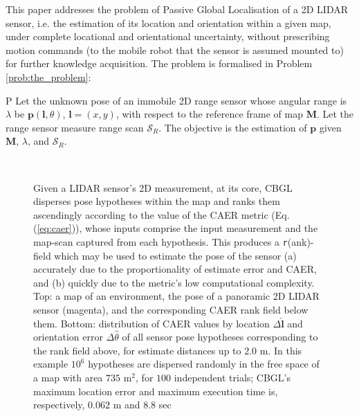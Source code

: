 This paper addresses the problem of Passive Global Localisation of a 2D LIDAR
sensor, i.e. the estimation of its location and orientation within a given map,
under complete locational and orientational uncertainty, without prescribing
motion commands (to the mobile robot that the sensor is assumed mounted to) for
further knowledge acquisition. The problem is formalised in Problem
\ref{prob:the_problem}:

\begin{customprb}{P}
  \label{prob:the_problem}
  Let the unknown pose of an immobile 2D range sensor whose angular range is
  $\lambda$ be $\bm{p}(\bm{l},\theta)$, $\bm{l} = (x,y)$, with respect to the
  reference frame of map $\bm{M}$. Let the range sensor measure range scan
  $\mathcal{S}_R$. The objective is the estimation of $\bm{p}$ given $\bm{M}$,
  $\lambda$, and $\mathcal{S}_R$.
\end{customprb}

\begin{figure}\vspace{0.4em}
  \subfloat{    \label{fig:a}} \vspace{-1.7cm}\\
  \subfloat{\hspace{-0.3cm} \label{fig:b}}
  \caption{\small
           Given a LIDAR sensor's 2D measurement, at its core, CBGL disperses
           pose hypotheses within the map and ranks them ascendingly according
           to the value of the CAER metric (Eq. (\ref{eq:caer})), whose inputs
           comprise the input measurement and the map-scan captured from each
           hypothesis. This produces a \texttt{r}(ank)-field which may be
           used to estimate the pose of the sensor (a) accurately due to the
           proportionality of estimate error and CAER, and (b) quickly due to
           the metric's low computational complexity.  Top: a map of an
           environment, the pose of a panoramic 2D LIDAR sensor (magenta), and
           the corresponding CAER rank field below them. Bottom: distribution
           of CAER values by location $\Delta \hat{\bm{l}}$ and orientation
           error $\Delta \hat{\theta}$ of all sensor pose hypotheses
           corresponding to the rank field above, for estimate distances up to
           $2.0$ m. In this example $10^6$ hypotheses are dispersed randomly in
           the free space of a map with area $735$ m$^2$, for $100$ independent
           trials; CBGL's maximum location error and maximum execution time is,
           respectively, $0.062$ m and $8.8$ sec }
  \vspace{-0.75cm}
  \label{fig:face}
\end{figure}
